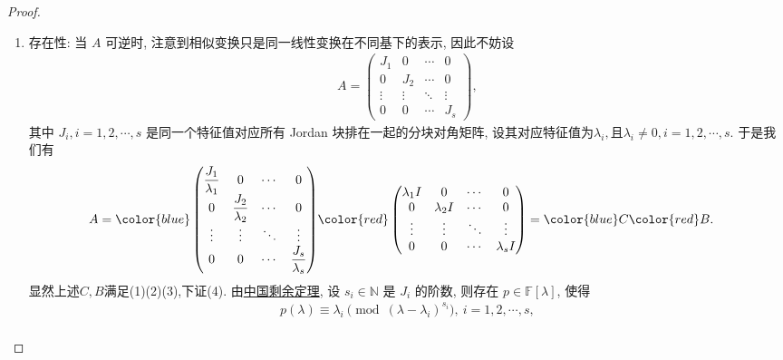 \documentclass[../../main.tex]{subfiles}
\begin{document}
\begin{proof}
\begin{enumerate}
{\heiti 唯一性:} 若还有 \( A = C' + B' \) 且满足条件 (1)--(3), 则 \( C' - C = B - B' \). 又 \( C' \) 和 \( C' \), \( B' \) 可交换, 所以 \( C' \) 和 \( A \) 可交换,又$C=q(A)$, 所以 \( C' \) 和 \( C \) 可交换. 类似的 \( B\)和\( B' \) 可交换. 因此对充分大的 \( n \), 利用$C,C'$为幂零矩阵和\hyperref[proposition:一族两两可交换的可对角化矩阵可同时相似对角化]{可交换的矩阵同时对角化}, 我们有
\[
0 = \sum_{k=0}^{n} C_n^k (C')^k C^{n - k} = (C' - C)^n = (B - B')^n \implies B = B', C = C',
\]
这就证明了唯一性.

\item {\heiti 存在性:} 当 \( A \) 可逆时, 注意到相似变换只是同一线性变换在不同基下的表示, 因此不妨设
\begin{align*}
A = \begin{pmatrix}
J_1 & 0 & \cdots & 0 \\
0 & J_2 & \cdots & 0 \\
\vdots & \vdots & \ddots & \vdots \\
0 & 0 & \cdots & J_s
\end{pmatrix},
\end{align*}
其中 \( J_i, i = 1, 2, \cdots, s \) 是同一个特征值对应所有 Jordan 块排在一起的分块对角矩阵, 设其对应特征值为$ \lambda_i,$且$\lambda_i\ne 0, i = 1, 2, \cdots, s.$
于是我们有
\begin{align*}
A &= {\color{blue} \begin{pmatrix}
\dfrac{J_1}{\lambda_1} & 0 & \cdots & 0 \\
0 & \dfrac{J_2}{\lambda_2} & \cdots & 0 \\
\vdots & \vdots & \ddots & \vdots \\
0 & 0 & \cdots & \dfrac{J_s}{\lambda_s}
\end{pmatrix}}
{\color{red} \begin{pmatrix}
\lambda_1 I & 0 & \cdots & 0 \\
0 & \lambda_2 I & \cdots & 0 \\
\vdots & \vdots & \ddots & \vdots \\
0 & 0 & \cdots & \lambda_s I
\end{pmatrix}} = {\color{blue} C}{\color{red} B}.
\end{align*}
显然上述$C,B$满足(1)(2)(3),下证(4).
由\hyperref[theorem:中国剩余定理(多项式版)]{中国剩余定理}, 设 \( s_i \in \mathbb{N} \) 是 \( J_i \) 的阶数, 则存在 \( p \in \mathbb{F}[\lambda] \), 使得
\begin{gather*}
p(\lambda) \equiv \lambda_i \pmod{(\lambda - \lambda_i)^{s_i}},\ i = 1, 2, \cdots, s,
\\

\end{gather*}
\end{enumerate}
\end{proof}
\end{document}
